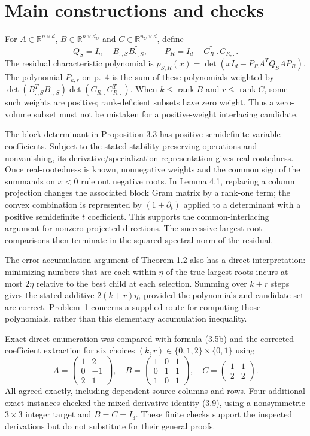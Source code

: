 \documentclass[10pt]{article}
\begin{document}
\section*{Main constructions and checks}
For \(A\in\mathbb R^{n\times d}\), \(B\in\mathbb R^{n\times d_B}\) and \(C\in\mathbb R^{n_C\times d}\), define \[Q_S=I_n-B_{:,S}B_{:,S}^{\dagger},\qquad
 P_R=I_d-C_{R,:}^{\dagger}C_{R,:}.\] The residual characteristic polynomial is \(p_{S,R}(x)=\det(xI_d-P_RA^TQ_SAP_R)\). The polynomial \(P_{k,r}\) on p. 4 is the sum of these polynomials weighted by \(\det(B_{:,S}^TB_{:,S})\det(C_{R,:}C_{R,:}^T)\). When \(k\leq\operatorname{rank}B\) and \(r\leq\operatorname{rank}C\), some such weights are positive; rank-deficient subsets have zero weight. Thus a zero-volume subset must not be mistaken for a positive-weight interlacing candidate.\par
The block determinant in Proposition 3.3 has positive semidefinite variable coefficients. Subject to the stated stability-preserving operations and nonvanishing, its derivative/specialization representation gives real-rootedness. Once real-rootedness is known, nonnegative weights and the common sign of the summands on \(x<0\) rule out negative roots. In Lemma 4.1, replacing a column projection changes the associated block Gram matrix by a rank-one term; the convex combination is represented by \((1+\partial_t)\) applied to a determinant with a positive semidefinite \(t\) coefficient. This supports the common-interlacing argument for nonzero projected directions. The successive largest-root comparisons then terminate in the squared spectral norm of the residual.\par
The error accumulation argument of Theorem 1.2 also has a direct interpretation: minimizing numbers that are each within \(\eta\) of the true largest roots incurs at most \(2\eta\) relative to the best child at each selection. Summing over \(k+r\) steps gives the stated additive \(2(k+r)\eta\), provided the polynomials and candidate set are correct. Problem 1 concerns a supplied route for computing those polynomials, rather than this elementary accumulation inequality.\par
Exact direct enumeration was compared with formula (3.5b) and the corrected coefficient extraction for six choices \((k,r)\in\{0,1,2\}\times\{0,1\}\) using \[A=\begin{pmatrix}1&2\\0&-1\\2&1\end{pmatrix},\quad
 B=\begin{pmatrix}1&0&1\\0&1&1\\1&0&1\end{pmatrix},\quad
 C=\begin{pmatrix}1&1\\2&2\end{pmatrix}.\] All agreed exactly, including dependent source columns and rows. Four additional exact instances checked the mixed derivative identity (3.9), using a nonsymmetric \(3\times3\) integer target and \(B=C=I_3\). These finite checks support the inspected derivations but do not substitute for their general proofs.\par
\end{document}
